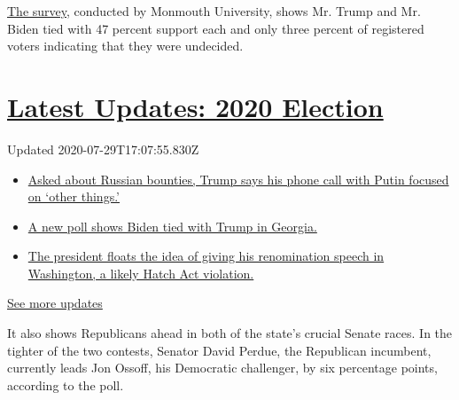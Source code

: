 \href{https://www.monmouth.edu/polling-institute/reports/monmouthpoll_GA_072920/}{The
survey}, conducted by Monmouth University, shows Mr. Trump and Mr. Biden
tied with 47 percent support each and only three percent of registered
voters indicating that they were undecided.

\hypertarget{latest-updates-2020-election}{%
\section{\texorpdfstring{\href{https://www.nytimes3xbfgragh.onion/2020/07/29/us/elections/biden-vs-trump.html?action=click\&pgtype=Article\&state=default\&region=MAIN_CONTENT_1\&context=storylines_live_updates}{Latest
Updates: 2020
Election}}{Latest Updates: 2020 Election}}\label{latest-updates-2020-election}}

Updated 2020-07-29T17:07:55.830Z

\begin{itemize}
\tightlist
\item
  \href{https://www.nytimes3xbfgragh.onion/2020/07/29/us/elections/biden-vs-trump.html?action=click\&pgtype=Article\&state=default\&region=MAIN_CONTENT_1\&context=storylines_live_updates\#link-1550d1d7}{Asked
  about Russian bounties, Trump says his phone call with Putin focused
  on `other things.'}
\item
  \href{https://www.nytimes3xbfgragh.onion/2020/07/29/us/elections/biden-vs-trump.html?action=click\&pgtype=Article\&state=default\&region=MAIN_CONTENT_1\&context=storylines_live_updates\#link-44f0348}{A
  new poll shows Biden tied with Trump in Georgia.}
\item
  \href{https://www.nytimes3xbfgragh.onion/2020/07/29/us/elections/biden-vs-trump.html?action=click\&pgtype=Article\&state=default\&region=MAIN_CONTENT_1\&context=storylines_live_updates\#link-7eba6945}{The
  president floats the idea of giving his renomination speech in
  Washington, a likely Hatch Act violation.}
\end{itemize}

\href{https://www.nytimes3xbfgragh.onion/2020/07/29/us/elections/biden-vs-trump.html?action=click\&pgtype=Article\&state=default\&region=MAIN_CONTENT_1\&context=storylines_live_updates}{See
more updates}

It also shows Republicans ahead in both of the state's crucial Senate
races. In the tighter of the two contests, Senator David Perdue, the
Republican incumbent, currently leads Jon Ossoff, his Democratic
challenger, by six percentage points, according to the poll.

